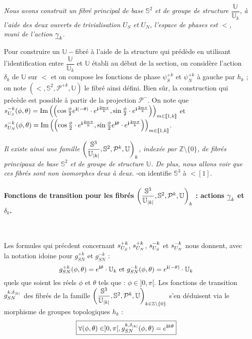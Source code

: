 \etoile
\emph{Nous avons construit un fibr\'e principal de base $\mathbb{S}^2$ et de groupe de structure $\dfrac{\mathbb{U}}{\mathbb{U}_k}$, %
\`a l'aide des deux ouverts de trivialisation $U_S$ et $U_N$, l'espace de phases est $\lt$, muni de l'action $\gk$}.
\par
Pour construire un $\mathbb{U}-$fibr\'e \`a l'aide de la structure qui pr\'ed\`ede en utilisant l'identification entre $\dfrac{\mathbb{U}}{\mathbb{U}_k}$ et $\mathbb{U}$ \'etabli au d\'ebut de la section, %
on consid\`ere l'action $\delta_k$ de $\mathbb{U}$ sur $\lt$ et on compose les fonctions de phase $\psi_S^{+k}$ et $\psi_N^{+k}$ \`a gauche par $h_k$ ; %
on note $\left(\lt ,\mathbb{S}^2,\mathcal{P}^{+k},\mathbb{U}\right)$ le fibr\'e ainsi d\'efini.
\ligneinter
Bien s\^ur, la construction qui pr\'ec\`ede est possible \`a partir de la projection $\mathcal{P}^-$. %
On note que $\se{S}{-k}(\phi,\theta)=\pla{\cos\frac{\phi}{2}\ec{(-\theta)}}{\sin\frac{\phi}{2}}$ et $\se{N}{-k}(\phi,\theta)=\pla{\cos\frac{\phi}{2}}{\sin\frac{\phi}{2}\ec{\theta}}$.
\par
\emph{Il existe ainsi une famille $\left(\lt[\abs{k}],\mathbb{S}^2,\mathcal{P}^k,\mathbb{U}\right)_k$, index\'ee par $\mathbb{Z}\setminus\{0\}$, de fibr\'es principaux de base $\mathbb{S}^2$ et de groupe de structure $\mathbb{U}$. %
De plus, nous allons voir que ces fibr\'es sont \emph{non isomorphes} deux \`a deux.} -on identifie $\mathbb{S}^3$ \`a $\lt[1]$.

\paragraph{Fonctions de transition pour les fibr\'es $\left(\lt[\abs{k}],\mathbb{S}^2,\mathcal{P}^k,\mathbb{U}\right)_k$ : actions $\gk$ et $\delta_k$.}~\\
\par
Les formules qui pr\'ecdent concernant $\se{S}{+k}$, $\se{N}{+k}$, $\se{S}{-k}$ et $\se{N}{-k}$ nous donnent, avec la notation idoine pour $g_{SN}^{+k}$ et $g_{SN}^{-k}$ :
\[g_{SN}^{+k}(\phi ,\theta)=\ec{\theta}\cdot\mathbb{U}_k\text{ et }g_{SN}^{-k}(\phi ,\theta)=\ec{(-\theta)}\cdot\mathbb{U}_k\]
quels que soient les r\'eels $\phi$ et $\theta$ tels que : $\phi\in ]0,\pi[$.
\ligneinter
Les fonctions de transition $g_{SN}^{k,\delta_{\abs{k}}}$ des fibr\'es de la famille $\left(\lt[\abs{k}],\mathbb{S}^2,\mathcal{P}^k,\mathbb{U}\right)_{k\in\mathbb{Z}\setminus\{0\}}$ %
s'en d\'eduisent via le morphisme de groupes topologiques $h_k$ :
\[\boxed{\forall (\phi,\theta)\in ]0,\pi [,g_{SN}^{k,\delta_{\abs{k}}}(\phi,\theta)=\ec{k\theta}}\]

